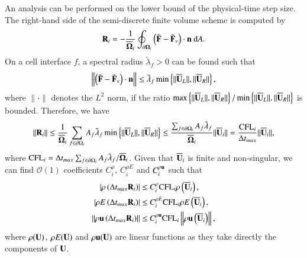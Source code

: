 An analysis can be performed on the lower bound of the physical-time step size.
The right-hand side of the semi-discrete finite volume scheme is computed by
\begin{equation}
    \label{eq:Semi-FV-1}
    \mathbf{R}_i = -\frac{1}{\overline{\mathbf{\Omega}}_i} \oint_{\partial \mathbf{\Omega}_i} \left(\tilde{\mathbf{F}} - \tilde{\mathbf{F}}_v \right) \cdot \mathbf{n} \ \dd A.
\end{equation}
On a cell interface $f$, a spectral radius $\tilde{\lambda}_f>0$ can be found such that
\begin{equation}
    \left\| \left(\tilde{\mathbf{F}} - \tilde{\mathbf{F}}_v \right) \cdot \mathbf{n} \right\| \leq \tilde{\lambda}_f \min \left\{\|\overline{\mathbf{U}}_L\|, \|\overline{\mathbf{U}}_R\| \right\},
\end{equation}
where $\|\cdot\|$ denotes the $L^2$ norm, if the ratio $\max \left\{\|\overline{\mathbf{U}}_L\|, \|\overline{\mathbf{U}}_R\| \right\}/\min \left\{\|\overline{\mathbf{U}}_L\|, \|\overline{\mathbf{U}}_R\| \right\}$ is bounded.
Therefore, we have
\begin{equation}
\label{eq:upper-bound-residual}
    \left\| \mathbf{R}_i \right\| 
    \leq \frac{1}{\overline{\mathbf{\Omega}}_i} \sum_{f \in \partial \Omega_i}{
        A_{f} \tilde{\lambda}_{f} \min \left\{\|\overline{\mathbf{U}}_L\|, \|\overline{\mathbf{U}}_R\| \right\}
    } 
    \leq \frac{\sum_{f \in \partial \Omega_i} A_f\tilde{\lambda}_f}{\overline{\mathbf{\Omega}}_i}\|\overline{\mathbf{U}}_i\|
    =
    \frac{\text{CFL}_i}{\mathrm\Delta t_{max}}\|\overline{\mathbf{U}}_i\|,
\end{equation}
where $\text{CFL}_i= \mathrm\Delta t_{max}\sum_{f \in \partial \Omega_i} A_f \tilde{\lambda}_f/\overline{\mathbf{\Omega}}_i$. 
Given that $\overline{\mathbf{U}}_i$ is finite and non-singular, we can find $\mathcal{O}(1)$ coefficients $C^{\rho}_i$, $C^{\rho E}_i$ and $C^{\rho \mathbf{u}}_i$ such that
\begin{equation}
    \begin{aligned}
    \label{eq:inc_upper_cond_const_coef}
        \left| \rho\left( \mathrm\Delta t_{max} \mathbf{R}_i \right) \right|
        & \leq
        C^\rho_i    \text{CFL}_i \rho\left( \overline{\mathbf{U}}_i \right),\\
        \left| \rho E\left( \mathrm\Delta t_{max} \mathbf{R}_i \right) \right|
        & \leq
        C^{\rho E}_i \text{CFL}_i \rho E\left( \overline{\mathbf{U}}_i \right),\\
        \left\| \rho \mathbf{u}\left( \mathrm\Delta t_{max} \mathbf{R}_i \right) \right\|
        & \leq 
        C^{\rho \mathbf{u}}_i \text{CFL}_i  \left\| \rho \mathbf{u}\left( \overline{\mathbf{U}}_i \right)              \right\|,\\
    \end{aligned}
\end{equation}
where $\rho(\mathbf{U})$, $\rho E(\mathbf{U})$ and $\rho \mathbf{u}(\mathbf{U})$ are linear functions as they take directly the components of $\mathbf{U}$.
